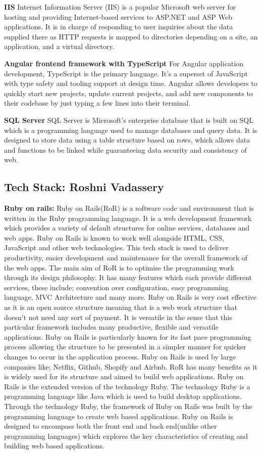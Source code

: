 \documentclass[a4paper, 11pt]{report}
\begin{document}
\textbf{IIS}
  Internet Information Server (IIS) is a popular Microsoft web server for hosting and providing Internet-based services to ASP.NET and ASP Web applications. It is in charge of responding to user inquiries about the data supplied there as HTTP requests is mapped to directories depending on a site, an application, and a virtual directory.

\textbf{Angular frontend framework with TypeScript}
  For Angular application development, TypeScript is the primary language. It's a superset of JavaScript with type safety and tooling support at design time. Angular allows developers to quickly start new projects, update current projects, and add new components to their codebase by just typing a few lines into their terminal.
  
\textbf{SQL Server}
  SQL Server is Microsoft's enterprise database that is built on SQL which is a programming language used to manage databases and query data.  It is designed to store data using a table structure based on rows, which allows data and functions to be linked while guaranteeing data security and consistency of web.


\subsection{Tech Stack: Roshni Vadassery}

\textbf{Ruby on rails:} Ruby on Rails(RoR) is a software code and environment that is written in the Ruby programming language. It is a web development framework which provides a variety of default structures for online services, databases and web apps. Ruby on Rails is known to work well alongside HTML, CSS, JavaScript and other web technologies. This tech stack is used to deliver productivity, easier development and maintenance for the overall framework of the web apps. The main aim of RoR is to optimise the programming work through its design philosophy. It has many features which each provide different services, these include; convention over configuration, easy programming language, MVC Architecture and many more.  Ruby on Rails is very cost effective as it is an open source structure meaning that is a web work structure that doesn't not need any sort of payment. It is versatile in the sense that this particular framework includes many productive, flexible and versatile applications. Ruby on Rails is particularly known for its fast pace programming process allowing the structure to be presented in a simpler manner for quicker changes to occur in the application process. Ruby on Rails is used by large companies like; Netflix, Github, Shopify and Airbnb. RoR has many benefits as it is widely used for its structure and aimed to build web applications. Ruby on Rails is the extended version of the technology Ruby. The technology Ruby is a programming language like Java which is used to build desktop applications. Through the technology Ruby, the framework of Ruby on Rails was built by the programming language to create web based applications. Ruby on Rails is designed to encompass both the front end and back end(unlike other programming languages) which explores the key characteristics of creating and building web based applications. 
\end{document}
